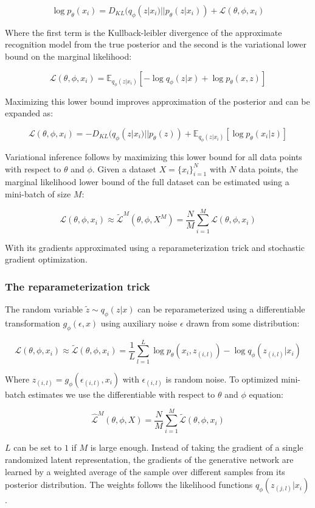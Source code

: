 	$$\log p_\theta(x_i) = D_{KL}(q_\phi(z|x_i) || p_\theta(z|x_i)) + \mathcal{L}(\theta, \phi, x_i)$$

	Where the first term is the Kullback-leibler divergence of the approximate recognition model from the true posterior and the second is the variational lower bound on the marginal likelihood:

	$$\mathcal{L}(\theta, \phi, x_i) = \mathbb{E}_{q_\phi(z|x_i)}[-\log q_\phi(z|x) + \log p_\theta(x, z)]$$

	Maximizing this lower bound improves approximation of the posterior and can be expanded as:

	$$\mathcal{L}(\theta, \phi, x_i) = -D_{KL}(q_\phi(z|x_i)||p_\theta(z)) + \mathbb{E}_{q_\phi(z|x_i)}[\log p_\theta(x_i|z)]$$

	Variational inference follows by maximizing this lower bound for all data points with respect to $\theta$ and $\phi$.
	Given a dataset $X=\{x_i\}^N_{i=1}$ with $N$ data points, the marginal likelihood lower bound of the full dataset can be estimated using a mini-batch of size $M$:

	$$\mathcal{L}(\theta, \phi, x_i) \approx \tilde{\mathcal{L}}^M(\theta, \phi, X^M) = \frac{N}{M}\sum\limits_{i=1}^M\mathcal{L}(\theta, \phi, x_i)$$

	With its gradients approximated using a reparameterization trick and stochastic gradient optimization.

		\subsubsection{The reparameterization trick}
		The random variable $\tilde{z}\sim q_\phi(z|x)$ can be reparameterized using a differentiable transformation $g_\phi(\epsilon, x)$ using auxiliary noise $\epsilon$ drawn from some distribution:

		$$\mathcal{L}(\theta, \phi, x_i) \approx \tilde{\mathcal{L}}(\theta, \phi, x_i) = \frac{1}{L}\sum\limits_{l=1}^L\log p_\theta(x_i, z_{(i, l)}) - \log q_\phi(z_{(i, l)}|x_i)$$

		Where $z_{(i, l)} = g_\phi(\epsilon_{(i, l)}, x_i)$ with $\epsilon_{(i, l)}$ is random noise.
		To optimized mini-batch estimates we use the differentiable with respect to $\theta$ and $\phi$ equation:

		$$\hat{\mathcal{L}}^M(\theta, \phi, X) = \frac{N}{M}\sum\limits_{i=1}^M\tilde{\mathcal{L}}(\theta, \phi, x_i)$$

		$L$ can be set to $1$ if $M$ is large enough.
		Instead of taking the gradient of a single randomized latent representation, the gradients of the generative network are learned by a weighted average of the sample over different samples from its posterior distribution.
		The weights follows the likelihood functions $q_\phi(z_{(j, l)}|x_i)$.

